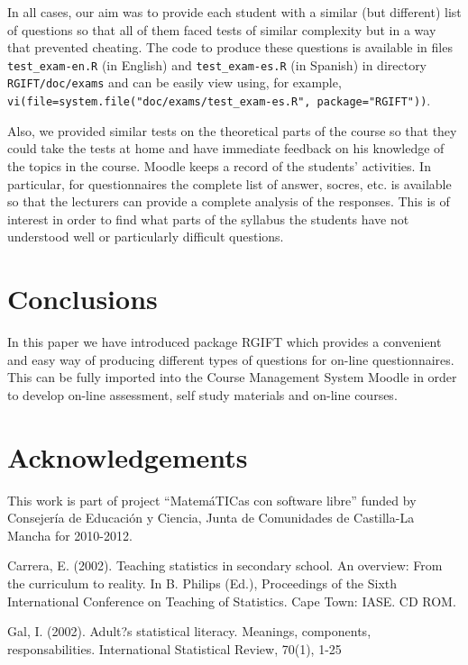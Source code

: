 \documentclass[a4paper]{article}
\newcommand{\code}[1]{\texttt{#1}}
\newcommand{\pkg}[1]{\textsf{#1}}
\begin{document}
In all cases, our aim was to provide each student with a similar (but
different) list of questions so that all of them faced tests of similar
complexity but in a way that prevented cheating.
The code to produce these questions is available in files 
\verb+test_exam-en.R+ (in English) and \verb+test_exam-es.R+ (in Spanish)
in directory \verb+RGIFT/doc/exams+ and can be easily view using, for example,
\code{vi(file=system.file("doc/exams/test\_exam-es.R", package="RGIFT"))}.

Also, we provided similar tests on the theoretical parts of the course so that
they could take the tests at home and have immediate feedback on his knowledge
of the topics in the course. Moodle keeps a record of the students' activities.
In particular, for questionnaires the complete list of answer, socres, etc.  is
available so that the lecturers can provide a complete analysis of the
responses. This is of interest in order to find what parts of the syllabus the
students have not understood well or particularly difficult questions.



\section{Conclusions}

In this paper we have introduced package \pkg{RGIFT} which provides a 
convenient and easy way of producing different types of questions
for on-line questionnaires. This can be fully imported into the
Course Management System Moodle in order to develop on-line assessment,
self study materials and on-line courses. 

\section{Acknowledgements}

This work is part of project ``MatemáTICas con software libre'' funded by
Consejería de Educación y Ciencia, Junta de Comunidades de Castilla-La Mancha
for 2010-2012.


%

%


Carrera, E. (2002). Teaching statistics in secondary school. An overview: From the curriculum to reality. In B. Philips (Ed.), Proceedings of the Sixth International Conference on  Teaching of Statistics. Cape Town: IASE. CD ROM.

Gal, I. (2002).  Adult?s statistical literacy. Meanings, components, responsabilities. International Statistical Review, 70(1), 1-25


%
%
%
\end{document}
